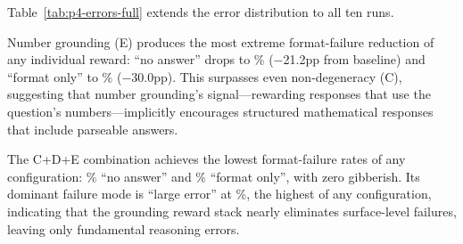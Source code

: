 Table~\ref{tab:p4-errors-full} extends the error distribution to all ten runs.



Number grounding (E) produces the most extreme format-failure reduction of any individual reward: ``no answer'' drops to \pFourSeparateENoAnswer\% ($-$21.2pp from baseline) and ``format only'' to \pFourSeparateEFormatOnly\% ($-$30.0pp).
This surpasses even non-degeneracy (C), suggesting that number grounding's signal---rewarding responses that use the question's numbers---implicitly encourages structured mathematical responses that include parseable answers.

The C+D+E combination achieves the lowest format-failure rates of any configuration: \pFourCombinedCdeNoAnswer\% ``no answer'' and \pFourCombinedCdeFormatOnly\% ``format only'', with zero gibberish.
Its dominant failure mode is ``large error'' at \pFourCombinedCdeLargeError\%, the highest of any configuration, indicating that the grounding reward stack nearly eliminates surface-level failures, leaving only fundamental reasoning errors.

